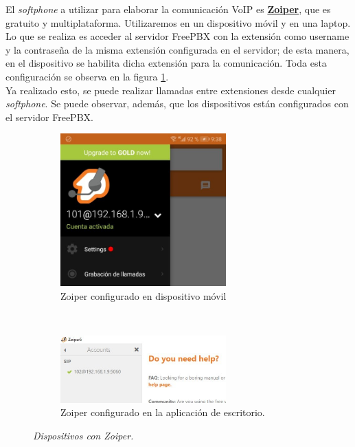 \documentclass[conference]{IEEEtran}
\begin{document}
El \textit{softphone} a utilizar para elaborar la comunicación VoIP es \href{https://www.zoiper.com/}{{\textbf{Zoiper}}}, que es gratuito y multiplataforma. Utilizaremos en un dispositivo móvil y en una laptop. Lo que se realiza es acceder al servidor FreePBX con la extensión como username y la contraseña de la misma extensión configurada en el servidor; de esta manera, en el dispositivo se habilita dicha extensión para la comunicación. Toda esta configuración se observa en la figura \ref{fig:metc0}.\\ Ya realizado esto, se puede realizar llamadas entre extensiones desde cualquier \textit{softphone}. Se puede observar, además, que los dispositivos están configurados con el servidor FreePBX.
\begin{figure}[h]
    \begin{subfigure}[h]{0.35\textwidth}
       \centerline{\includegraphics[width=0.7\textwidth]{img/metc03.jpeg}}
        \caption{Zoiper configurado en dispositivo móvil}

    \end{subfigure}
    ~ %
     \begin{subfigure}[h]{0.35\textwidth}
        \centerline{\includegraphics[width=0.7\textwidth]{img/metc04.jpeg}}
        \caption{Zoiper configurado en la aplicación de escritorio.}

    \end{subfigure}
    \caption{\textit{Dispositivos con Zoiper.}}
\label{fig:metc0}
\end{figure}
\end{document}
